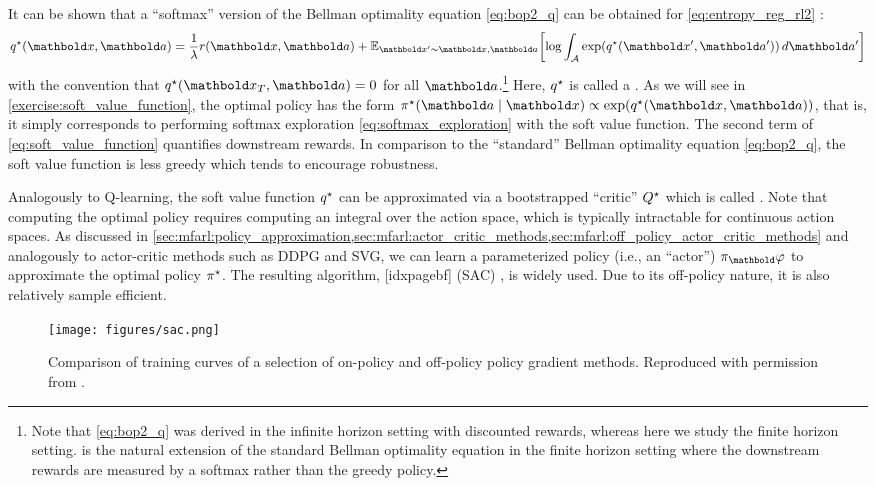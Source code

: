 It can be shown that a ``softmax'' version of the Bellman optimality equation \eqref{eq:bop2_q} can be obtained for \cref{eq:entropy_reg_rl2} : \begin{align}
  \q*{\vx}{\va} = \frac{1}{\lambda} r(\vx, \va) + \E[\vxp \sim \vx, \va]{\log \int_{\spA} \exp\parentheses*{\q*{\vxp}{\vap}} \,d \vap} \label{eq:soft_value_function}
\end{align} with the convention that $\q*{\vx_T}{\va} = 0$ for all $\va$.\footnote{Note that \cref{eq:bop2_q} was derived in the infinite horizon setting with discounted rewards, whereas here we study the finite horizon setting.  is the natural extension of the standard Bellman optimality equation in the finite horizon setting where the downstream rewards are measured by a softmax rather than the greedy policy.}
Here, $\opt{\fnq}$ is called a .
As we will see in \cref{exercise:soft_value_function}, the optimal policy has the form $\pis(\va \mid \vx) \propto \exp(\q*{\vx}{\va})$, that is, it simply corresponds to performing softmax exploration \eqref{eq:softmax_exploration} with the soft value function.
The second term of \cref{eq:soft_value_function} quantifies downstream rewards.
In comparison to the ``standard'' Bellman optimality equation \eqref{eq:bop2_q}, the soft value function is less greedy which tends to encourage robustness.

Analogously to Q-learning, the soft value function $\opt{\fnq}$ can be approximated via a bootstrapped ``critic'' $\opt{\fnQ}$ which is called  \citep{levine2018reinforcement}.
Note that computing the optimal policy requires computing an integral over the action space, which is typically intractable for continuous action spaces.
As discussed in \cref{sec:mfarl:policy_approximation,sec:mfarl:actor_critic_methods,sec:mfarl:off_policy_actor_critic_methods} and analogously to actor-critic methods such as DDPG and SVG, we can learn a parameterized policy (i.e., an ``actor'') $\pi_\vvarphi$ to approximate the optimal policy $\pi^\star$.
The resulting algorithm, [idxpagebf] (SAC) \citep{haarnoja2018soft,haarnoja2018soft2}, is widely used.
Due to its off-policy nature, it is also relatively sample efficient.

\begin{figure*}
  \texttt{[image: figures/sac.png]}
  \caption{Comparison of training curves of a selection of on-policy and off-policy policy gradient methods.
  Reproduced with permission from .}
\end{figure*}

